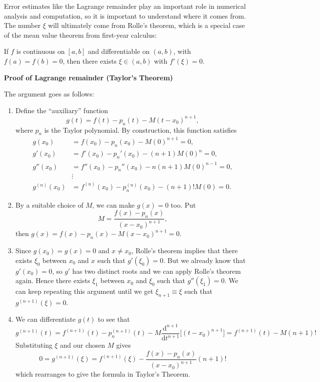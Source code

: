\documentclass[
  letterpaper,
  DIV=11,
  numbers=noendperiod]{scrreprt}
\providecommand{\tightlist}{%
  \setlength{\itemsep}{0pt}\setlength{\parskip}{0pt}}
\newenvironment{fbxSimple}[3]{\begin{tcolorbox}[enhanced, breakable,%
attach boxed title to top*={xshift=1.4pt},
boxed title style={boxrule=0.0mm, fuzzy shadow={1pt}{-1pt}{0mm}{0.1mm}{gray}, arc=.3em, rounded corners=east, sharp corners=west}, colframe=#1-color2, colbacktitle=#1-color1, colback = white, coltitle=black,  titlerule=0mm, toprule=0pt, bottomrule=.7pt, leftrule=.3em, rightrule=.7pt, outer arc=.3em,  	left=.5em, right=.5em, bottomtitle=1mm, toptitle=1mm,title=\textbf{#2}\hspace{0.5em}{#3}]}
{\end{tcolorbox}}
\begin{document}
Error estimates like the Lagrange remainder play an important role in
numerical analysis and computation, so it is important to understand
where it comes from. The number \(\xi\) will ultimately come from
Rolle's theorem, which is a special case of the mean value theorem from
first-year calculus:

\label{rolles-theorem}
\begin{fbxSimple}{theorem}{Theorem 2.3: }{Rolle’s Theorem}
\label{rolles-theorem}
If \(f\) is continuous on \([a,b]\) and differentiable on \((a,b)\),
with \(f(a)=f(b)=0\), then there exists \(\xi\in(a,b)\) with
\(f'(\xi)=0\).

\end{fbxSimple}

\textbf{Proof of Lagrange remainder (Taylor's Theorem)}

The argument goes as follows:

\begin{enumerate}
\def\labelenumi{\arabic{enumi}.}
\tightlist
\item
  Define the ``auxiliary'' function\\
  \[
  g(t) = f(t) - p_n(t) - M(t-x_0)^{n+1},
  \] where \(p_n\) is the Taylor polynomial. By construction, this
  function satisfies \[
  \begin{aligned}
  g(x_0) &= f(x_0) - p_n(x_0) - M(0)^{n+1} = 0,\\
  g'(x_0) &= f'(x_0) - p_n'(x_0) - (n+1)M(0)^{n} = 0,\\
  g''(x_0) &= f''(x_0) - p_n''(x_0) - n(n+1)M(0)^{n-1} = 0,\\
  &\vdots\\
  g^{(n)}(x_0) &= f^{(n)}(x_0) - p_n^{(n)}(x_0) - (n+1)!M(0) = 0.
  \end{aligned}
  \]
\item
  By a suitable choice of \(M\), we can make \(g(x)=0\) too. Put\\
  \[
  M = \frac{f(x) - p_n(x)}{(x-x_0)^{n+1}},
  \] then \(g(x) = f(x) - p_n(x) - M(x-x_0)^{n+1} = 0\).
\item
  Since \(g(x_0)=g(x)=0\) and \(x\neq x_0\), Rolle's theorem implies
  that there exists \(\xi_0\) between \(x_0\) and \(x\) such that
  \(g'(\xi_0)=0\). But we already know that \(g'(x_0)=0\), so \(g'\) has
  two distinct roots and we can apply Rolle's theorem again. Hence there
  exists \(\xi_1\) between \(x_0\) and \(\xi_0\) such that
  \(g''(\xi_1)=0\). We can keep repeating this argument until we get
  \(\xi_{n+1}\equiv \xi\) such that \(g^{(n+1)}(\xi)=0\).
\item
  We can differentiate \(g(t)\) to see that\\
  \[
  g^{(n+1)}(t) = f^{(n+1)}(t) - p_n^{(n+1)}(t) - M \frac{\mathrm{d}^{n+1}}{\mathrm{d}t^{n+1}}\big[(t-x_0)^{n+1}\big] = f^{(n+1)}(t) - M(n+1)!
  \] Substituting \(\xi\) and our chosen \(M\) gives\\
  \[
  0 = g^{(n+1)}(\xi) = f^{(n+1)}(\xi) - \frac{f(x) - p_n(x)}{(x-x_0)^{n+1}}(n+1)!
  \] which rearranges to give the formula in Taylor's Theorem.
\end{enumerate}
\end{document}
